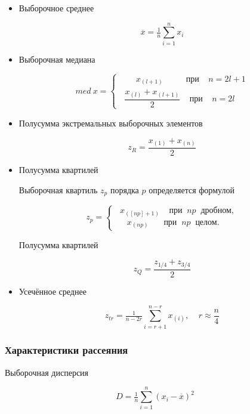 \begin{itemize}
	\item Выборочное среднее
	
	\begin{equation} \label{eq:mean}
		\overline{x} = \tfrac{1}{n}\sum\limits_{i=1}^n x_i
	\end{equation}
	
	\item Выборочная медиана
	
	\begin{equation} \label{eq:med}
		med \: x = 
		\begin{cases} 
			\;\;\;\;\;\;\; x_{(l+1)} \:\;\;\;\;\;\;\;\;\; \text{при} \;\;\;\; n = 2l + 1\\
			\;\; \dfrac{x_{(l)} + x_{(l+1)}}{2} \;\;\;\; \text{при} \;\;\;\; n = 2l
		\end{cases}
	\end{equation}
	
	\item Полусумма экстремальных выборочных элементов
	
	\begin{equation} \label{eq:zR}
		z_R = \dfrac{x_{(1)} + x_{(n)}}{2}
	\end{equation}
	
	\item Полусумма квартилей
	
	Выборочная квартиль $z_p$ порядка $p$ определяется формулой
	
	\begin{equation}
		z_p =
		\begin{cases}
			\;\; x_{([np]+1)} \;\;\;\; \text{при} \;\; np \;\; \text{дробном},\\
			\;\;\;\;\; x_{(np)} \,\:\;\;\;\;\; \text{при} \;\; np \;\; \text{целом}.
		\end{cases}
	\end{equation}
	
	Полусумма квартилей
	
	\begin{equation} \label{eq:zQ}
		z_Q = \dfrac{z_{1/4} + z_{3/4}}{2}
	\end{equation}
	
	\item Усечённое среднее
	
	\begin{equation} \label{eq:zTr}
		z_{tr} = \tfrac{1}{n-2r}\sum\limits_{i=r+1}^{n-r} x_{(i)}, \;\;\;\; r \approx \dfrac{n}{4}
	\end{equation}
	
\end{itemize}

\subsubsection{Характеристики рассеяния}

Выборочная дисперсия

\begin{equation}
	D = \tfrac{1}{n}\sum\limits_{i=1}^{n} (x_i - \overline{x})^2
\end{equation}



